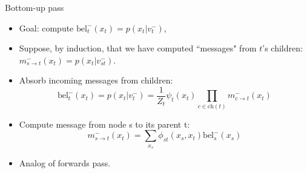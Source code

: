 \documentclass[10pt,mathserif]{beamer}
\begin{document}
\begin{frame}{Bottom-up pass}
\begin{itemize}
    \item Goal: compute $\text{bel}_t^- (x_t)= p(x_t|v_t^-)$,
    \item Suppose, by induction, that we have computed ``messages" from $t$'s children: $m_{s\rightarrow t}^-(x_t) = p(x_t|v_{st}^-)$.
    \item Absorb incoming messages from children:
    \begin{equation}
        \text{bel}_t^-(x_t) = p(x_t|v_t^-)=\frac{1}{Z_t}\psi_t(x_t)  \prod_{c\in\text{ch}(t)} m_{c\rightarrow t}^- (x_t)
    \end{equation}
    
    \item Compute message from node s to its parent t:
    \begin{equation}
        m_{s\rightarrow t}^-(x_t) = \sum_{x_s}  \phi_{st} (x_s,x_t)\text{bel}_s^-(x_s)
    \end{equation}
    
    \item Analog of forwards pass.
\end{itemize}
\end{frame}
\end{document}
